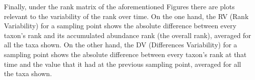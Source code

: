 Finally, under the rank matrix of the aforementioned Figures there are plots relevant to the variability of the rank over time. On the one hand, the RV (Rank Variability) for a sampling point shows the absolute difference between every taxon's rank and its accumulated abundance rank (the overall rank), averaged for all the taxa shown. On the other hand, the DV (Differences Variability) for a sampling point shows the absolute difference between every taxon's rank at that time and the value that it had at the previous sampling point, averaged for all the taxa shown.

